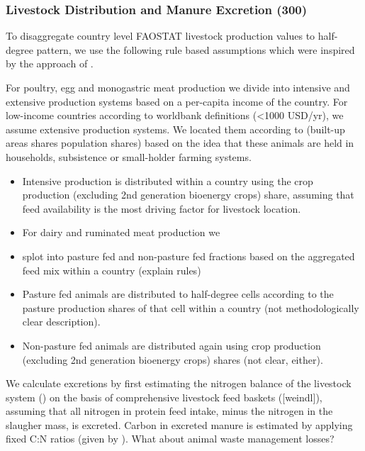 \documentclass[gc, manuscript]{copernicus}
\begin{document}
\subsubsection{Livestock Distribution and Manure Excretion (300)}

To disaggregate country level FAOSTAT livestock production values to
half-degree pattern, we use the following rule based assumptions which
were inspired by the approach of \citep{gilbert}.

For poultry, egg and monogastric meat production we divide into
intensive and extensive production systems based on a per-capita income
of the country. For low-income countries according to worldbank
definitions (\textless1000 USD/yr), we assume extensive production
systems. We located them according to (built-up areas shares\textbar{}
population shares) based on the idea that these animals are held in
households, subsistence or small-holder farming systems.

\begin{itemize}
\item
  Intensive production is distributed within a country using the crop
  production (excluding 2nd generation bioenergy crops) share, assuming
  that feed availability is the most driving factor for livestock
  location.
\item
  For dairy and ruminated meat production we
\item
  splot into pasture fed and non-pasture fed fractions based on the
  aggregated feed mix within a country (explain rules)
\end{itemize}

\begin{itemize}
\item
  Pasture fed animals are distributed to half-degree cells according to
  the pasture production shares of that cell within a country (not
  methodologically clear description).
\item
  Non-pasture fed animals are distributed again using crop production
  (excluding 2nd generation bioenergy crops) shares (not clear, either).
\end{itemize}

We calculate excretions by first estimating the nitrogen balance of the
livestock system (\citep{bodirsky1012}) on the basis of comprehensive
livestock feed baskets ({[}weindl{]}), assuming that all nitrogen in
protein feed intake, minus the nitrogen in the slaugher mass, is
excreted. Carbon in excreted manure is estimated by applying fixed C:N
ratios (given by \citep[(][]{ipcc_2019_2019}). What about animal waste
management losses?
\end{document}
